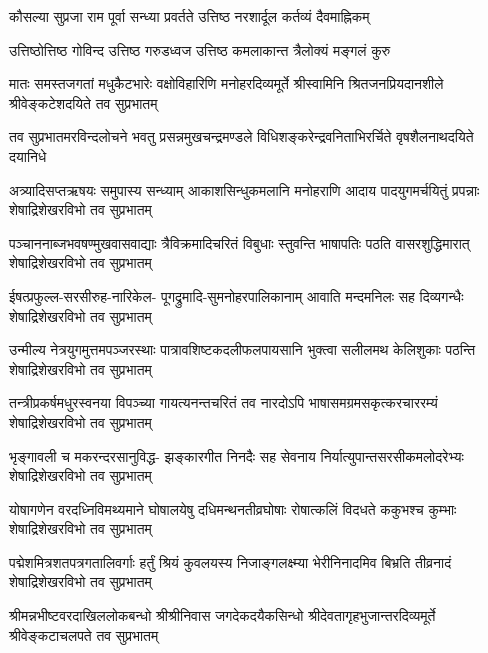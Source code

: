 
\twolineshloka
{कौसल्या सुप्रजा राम पूर्वा सन्ध्या प्रवर्तते}
{उत्तिष्ठ नरशार्दूल कर्तव्यं दैवमाह्निकम्}

\twolineshloka
{उत्तिष्ठोत्तिष्ठ गोविन्द उत्तिष्ठ गरुडध्वज}
{उत्तिष्ठ कमलाकान्त त्रैलोक्यं मङ्गलं कुरु}

\fourlineindentedshloka
{मातः समस्तजगतां मधुकैटभारेः}
{वक्षोविहारिणि मनोहरदिव्यमूर्ते}
{श्रीस्वामिनि श्रितजनप्रियदानशीले}
{श्रीवेङ्कटेशदयिते तव सुप्रभातम्}

\fourlineindentedshloka
{तव सुप्रभातमरविन्दलोचने}
{भवतु प्रसन्नमुखचन्द्रमण्डले}
{विधिशङ्करेन्द्रवनिताभिरर्चिते}
{वृषशैलनाथदयिते दयानिधे}

\fourlineindentedshloka
{अत्र्यादिसप्तऋषयः समुपास्य सन्ध्याम्}
{आकाशसिन्धुकमलानि मनोहराणि}
{आदाय पादयुगमर्चयितुं प्रपन्नाः}
{शेषाद्रिशेखरविभो तव सुप्रभातम्}

\fourlineindentedshloka
{पञ्चाननाब्जभवषण्मुखवासवाद्याः}
{त्रैविक्रमादिचरितं विबुधाः स्तुवन्ति}
{भाषापतिः पठति वासरशुद्धिमारात्}
{शेषाद्रिशेखरविभो तव सुप्रभातम्}

\fourlineindentedshloka
{ईषत्प्रफुल्ल-सरसीरुह-नारिकेल-}
{पूगद्रुमादि-सुमनोहरपालिकानाम्}
{आवाति मन्दमनिलः सह दिव्यगन्धैः}
{शेषाद्रिशेखरविभो तव सुप्रभातम्}

\fourlineindentedshloka
{उन्मील्य नेत्रयुगमुत्तमपञ्जरस्थाः}
{पात्रावशिष्टकदलीफलपायसानि}
{भुक्त्वा सलीलमथ केलिशुकाः पठन्ति}
{शेषाद्रिशेखरविभो तव सुप्रभातम्}

\fourlineindentedshloka
{तन्त्रीप्रकर्षमधुरस्वनया विपञ्च्या}
{गायत्यनन्तचरितं तव नारदोऽपि}
{भाषासमग्रमसकृत्करचाररम्यं}
{शेषाद्रिशेखरविभो तव सुप्रभातम्}

\fourlineindentedshloka
{भृङ्गावली च मकरन्दरसानुविद्ध-}
{झङ्कारगीत निनदैः सह सेवनाय}
{निर्यात्युपान्तसरसीकमलोदरेभ्यः}
{शेषाद्रिशेखरविभो तव सुप्रभातम्}

\fourlineindentedshloka
{योषागणेन वरदध्निविमथ्यमाने}
{घोषालयेषु दधिमन्थनतीव्रघोषाः}
{रोषात्कलिं विदधते ककुभश्च कुम्भाः}
{शेषाद्रिशेखरविभो तव सुप्रभातम्}

\fourlineindentedshloka
{पद्मेशमित्रशतपत्रगतालिवर्गाः}
{हर्तुं श्रियं कुवलयस्य निजाङ्गलक्ष्म्या}
{भेरीनिनादमिव बिभ्रति तीव्रनादं}
{शेषाद्रिशेखरविभो तव सुप्रभातम्}

\fourlineindentedshloka
{श्रीमन्नभीष्टवरदाखिललोकबन्धो}
{श्रीश्रीनिवास जगदेकदयैकसिन्धो}
{श्रीदेवतागृहभुजान्तरदिव्यमूर्ते}
{श्रीवेङ्कटाचलपते तव सुप्रभातम्}

